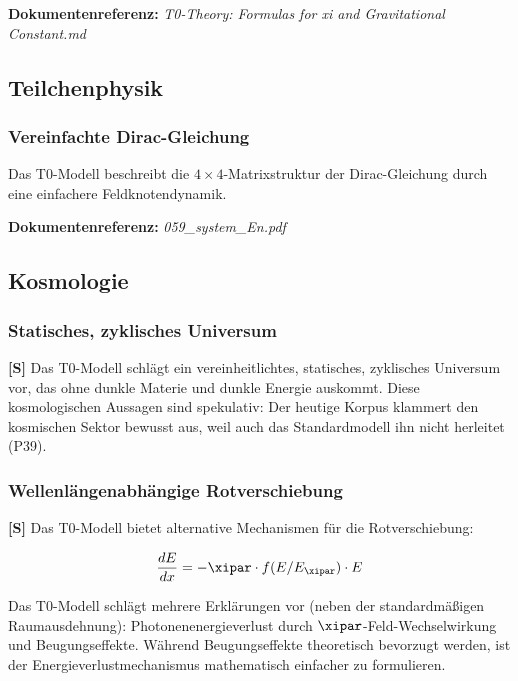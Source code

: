 \textbf{Dokumentenreferenz:} \textit{T0-Theory: Formulas for xi and Gravitational Constant.md}

\subsection{Teilchenphysik}

\subsubsection{Vereinfachte Dirac-Gleichung}

Das T0-Modell beschreibt die $4 \times 4$-Matrixstruktur der Dirac-Gleichung durch eine einfachere Feldknotendynamik.

\textbf{Dokumentenreferenz:} \textit{059\_system\_En.pdf}

\subsection{Kosmologie}

\subsubsection{Statisches, zyklisches Universum}

\textbf{[S]} Das T0-Modell schlägt ein vereinheitlichtes, statisches, zyklisches Universum vor, das ohne dunkle Materie und dunkle Energie auskommt. Diese kosmologischen Aussagen sind spekulativ: Der heutige Korpus klammert den kosmischen Sektor bewusst aus, weil auch das Standardmodell ihn nicht herleitet (P39).

\subsubsection{Wellenlängenabhängige Rotverschiebung}

\textbf{[S]} Das T0-Modell bietet alternative Mechanismen für die Rotverschiebung:

\begin{equation}
	\frac{dE}{dx} = -\xipar \cdot f(E/E_\xipar) \cdot E
\end{equation}

Das T0-Modell schlägt mehrere Erklärungen vor (neben der standardmäßigen Raumausdehnung): Photonenenergieverlust durch $\xipar$-Feld-Wechselwirkung und Beugungseffekte. Während Beugungseffekte theoretisch bevorzugt werden, ist der Energieverlustmechanismus mathematisch einfacher zu formulieren.

